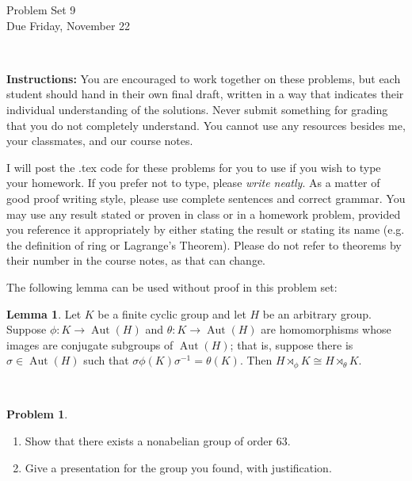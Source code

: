 \documentclass[11pt]{article}
\title{}
\date{\vspace{-0.5in}}
\DeclareMathOperator{\Aut}{Aut}
\newcommand{\sdp}{\rtimes}
\theoremstyle{definition}
\newtheorem{problem}{Problem}
\newtheorem{lemma}{Lemma}
\begin{document}
\thispagestyle{fancy}
\pagestyle{fancy}

\vspace{3em}

\begin{center}
	{\LARGE Problem Set 9\\}
	Due Friday, November 22
\end{center}

\

\noindent
{\bf Instructions:}
You are encouraged to work together on these problems, but each student should hand in their own final draft, written in a way that indicates their individual understanding of the solutions. Never submit something for grading that you do not completely understand. You cannot use any resources besides me, your classmates, and our course notes.


I will post the .tex code for these problems for you to use if you wish to type your homework. If you prefer not to type, please  {\em write neatly}. As a matter of good proof writing style, please use complete sentences and correct grammar. You may use any result  stated or proven in class or in a homework problem, provided you reference it appropriately by either stating the result or stating its name (e.g. the definition of ring or Lagrange's Theorem). Please do not refer to theorems by their number in the course notes, as that can change.


\vspace{2em}



\noindent
The following lemma can be used without proof in this problem set:


\begin{lemma}
Let $K$ be a finite cyclic group and let $H$ be an arbitrary group. Suppose $\phi\!: K \to \Aut(H)$ and $\theta\!: K \to \Aut(H)$ are homomorphisms whose images are conjugate subgroups of $\Aut(H)$; that is, suppose there is $\sigma \in \Aut(H)$ such that $\sigma \phi(K) \sigma^{-1} = \theta(K)$. Then $H \sdp_\phi K \cong H \sdp_\theta K$. 
\end{lemma}

\

\begin{problem}$\,$
\begin{enumerate}[label=(1.\arabic*), itemsep=0.1em]
\item Show that there exists a nonabelian group of order $63$.

\item Give a presentation for the group you found, with justification.	
\end{enumerate}
\end{problem}
\end{document}
